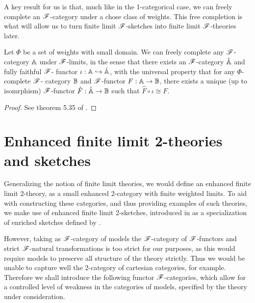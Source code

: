 \documentclass[../thesis.tex]{subfiles}
\begin{document}
A key result for us is that, much like in the 1-categorical case, we can freely complete an ${\mathscr{F}}$-category
under a chose class of weights. This free completion is what will allow us to turn finite limit ${\mathscr{F}}$-sketches
into finite limit ${\mathscr{F}}$-theories later. 
\begin{theorem}\label{thm:free completion}
  Let $\Phi$ be a set of weights with small domain. We can freely complete any ${\mathscr{F}}$-category ${\mathbb{A}}$ under
  ${\mathscr{F}}$-limits, in the sense that there exists an ${\mathscr{F}}$-category $\hat{{\mathbb{A}}}$ and fully faithful ${\mathscr{F}}$-%
  functor $\iota : {\mathbb{A}} \hookrightarrow \hat {{\mathbb{A}}}$, with the universal property that for any $\Phi$-complete ${\mathscr{F}}$-%
  category ${\mathbb{B}}$ and ${\mathscr{F}}$-functor $F : {\mathbb{A}} \to {\mathbb{B}}$, there exists a unique (up to isomrphism) ${\mathscr{F}}$-functor
  $\hat F : \hat{{\mathbb{A}}} \to {\mathbb{B}}$ such that $\hat F \circ \iota \cong F$.
\end{theorem}
\begin{proof}
  See theorem 5.35 of \cite{kelly1982a}.
\end{proof}

\section{Enhanced finite limit 2-theories and sketches}
Generalizing the notion of finite limit theories, we would define an enhanced finite limit 2-theory,
as a small enhanced 2-category with finite weighted limits. To aid with constructing these categories,
and thus providing examples of such theories, we make use of enhanced finite limit 2-sketches, introduced
in \cite{arkor2024} as a specialization of enriched sketches defined by \cite{kelly1982a}. 

However, taking as ${\mathscr{F}}$-category of models the ${\mathscr{F}}$-category of ${\mathscr{F}}$-functors and strict ${\mathscr{F}}$-natural
transformations is too strict for our purposes, as this would require models to preserve all structure
of the theory strictly. Thus we would be unable to capture well the 2-category of cartesian categories,
for example. Therefore we shall introduce the following functor ${\mathscr{F}}$-categories, which allow for a
controlled level of weakness in the categories of models, specified by the theory under consideration.
\end{document}
